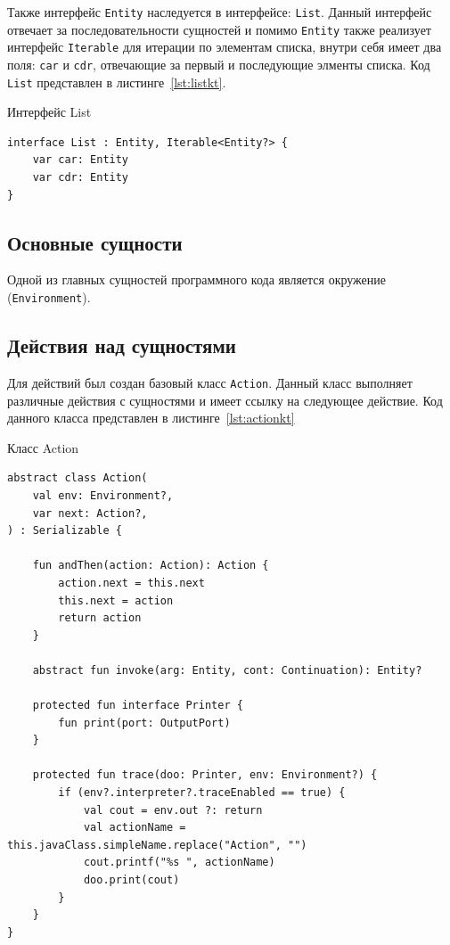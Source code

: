\documentclass[14pt, russian]{scrartcl}
\begin{document}
Также интерфейс \texttt{Entity} наследуется в интерфейсе: \texttt{List}. Данный интерфейс отвечает за последовательности сущностей и помимо \texttt{Entity} также реализует интерфейс \texttt{Iterable} для итерации по элементам списка, внутри себя имеет два поля: \texttt{car} и \texttt{cdr}, отвечающие за первый и последующие элменты списка. Код \texttt{List} представлен в листинге~\ref{lst:listkt}.

\begin{listing}[!htb]
\caption{Интерфейс List}
\label{lst:listkt}
\begin{verbatim}
interface List : Entity, Iterable<Entity?> {
    var car: Entity
    var cdr: Entity
}
\end{verbatim}
\end{listing}

\subsection{Основные сущности}

Одной из главных сущностей программного кода является окружение (\texttt{Environment}). 

\subsection{Действия над сущностями}

Для действий был создан базовый класс \texttt{Action}. Данный класс выполняет различные действия с сущностями и имеет ссылку на следующее действие. Код данного класса представлен в листинге~\ref{lst:actionkt}

\begin{listing}[!htb]
\caption{Класс Action}
\label{lst:actionkt}
\begin{verbatim}
abstract class Action(
    val env: Environment?,
    var next: Action?,
) : Serializable {

    fun andThen(action: Action): Action {
        action.next = this.next
        this.next = action
        return action
    }

    abstract fun invoke(arg: Entity, cont: Continuation): Entity?

    protected fun interface Printer {
        fun print(port: OutputPort)
    }

    protected fun trace(doo: Printer, env: Environment?) {
        if (env?.interpreter?.traceEnabled == true) {
            val cout = env.out ?: return
            val actionName = this.javaClass.simpleName.replace("Action", "")
            cout.printf("%s ", actionName)
            doo.print(cout)
        }
    }
}

\end{verbatim}
\end{listing}
\end{document}
